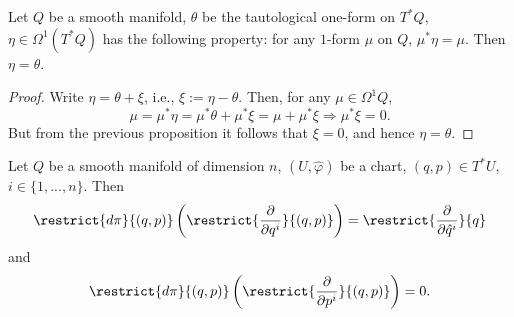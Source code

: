 \begin{corollary}
  Let
    $Q$ be a smooth manifold,
    $\theta$ be the tautological one-form on $T^* Q$,
    $\eta \in \Omega^1(T^* Q)$ has the following property:
    for any $1$-form $\mu$ on $Q$, $\mu^* \eta = \mu$.
  Then $\eta = \theta$.
\end{corollary}
\begin{proof}
  Write $\eta = \theta + \xi$, i.e., $\xi := \eta - \theta$.
  Then, for any $\mu \in \Omega^1 Q$,
  \begin{equation}
    \mu
    = \mu^* \eta
    = \mu^* \theta + \mu^* \xi
    = \mu + \mu^* \xi
    \Rightarrow \mu^* \xi = 0.
  \end{equation}
  But from the previous proposition it follows that $\xi = 0$,
  and hence $\eta = \theta$.
\end{proof}
\begin{proposition}
  Let
    $Q$ be a smooth manifold of dimension $n$,
    $(U, \hat{\varphi})$ be a chart,
    $(q, p) \in T^* U$,
    $ i \in \{1, ..., n\}$.
  Then
  \begin{equation}
    \restrict{d \pi}{(q, p)}
    \left(\restrict{\frac{\partial}{\partial q^i}}{(q, p)}\right)
    = \restrict{\frac{\partial}{\partial \hat{q}^i}}{q}
  \end{equation}
  and
  \begin{equation}
    \restrict{d \pi}{(q, p)}
    \left(\restrict{\frac{\partial}{\partial p^i}}{(q, p)}\right)
    = 0.
  \end{equation}
\end{proposition}
